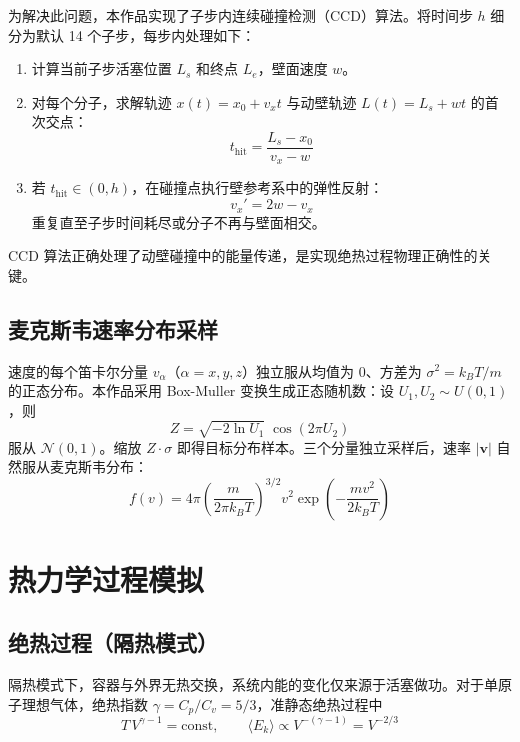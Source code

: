\documentclass[zihao=-4,a4paper,oneside]{ctexbook}
\newcommand{\avg}[1]{\langle #1 \rangle}
\newcommand{\kb}{k_{\!B}}
\newcommand{\abs}[1]{\lvert#1\rvert}
\begin{document}
为解决此问题，本作品实现了子步内连续碰撞检测（CCD）算法。将时间步 $h$ 细分为默认 14 个子步，每步内处理如下：

\begin{enumerate}
  \item 计算当前子步活塞位置 $L_s$ 和终点 $L_e$，壁面速度 $w$。
  \item 对每个分子，求解轨迹 $x(t)=x_0+v_x t$ 与动壁轨迹 $L(t)=L_s+wt$ 的首次交点：
  \begin{equation}
    t_{\text{hit}} = \frac{L_s-x_0}{v_x-w}
  \end{equation}
  \item 若 $t_{\text{hit}}\in(0,h)$，在碰撞点执行壁参考系中的弹性反射：
  \begin{equation}
    v_x' = 2w - v_x
  \end{equation}
  重复直至子步时间耗尽或分子不再与壁面相交。
\end{enumerate}
CCD 算法正确处理了动壁碰撞中的能量传递，是实现绝热过程物理正确性的关键。

\subsection{麦克斯韦速率分布采样}

速度的每个笛卡尔分量 $v_\alpha$（$\alpha=x,y,z$）独立服从均值为 $0$、方差为 $\sigma^2=\kb T/m$ 的正态分布。本作品采用 Box-Muller 变换生成正态随机数：设 $U_1,U_2\sim U(0,1)$，则
\begin{equation}
  Z = \sqrt{-2\ln U_1}\;\cos(2\pi U_2)
\end{equation}
服从 $\mathcal{N}(0,1)$。缩放 $Z\cdot \sigma$ 即得目标分布样本。三个分量独立采样后，速率 $\abs{\bm{v}}$ 自然服从麦克斯韦分布：
\begin{equation}
  f(v)=4\pi\left(\frac{m}{2\pi\kb T}\right)^{\!3/2} v^2 \exp\!\left(-\frac{m v^2}{2\kb T}\right)
\end{equation}

\section{热力学过程模拟}

\subsection{绝热过程（隔热模式）}

隔热模式下，容器与外界无热交换，系统内能的变化仅来源于活塞做功。对于单原子理想气体，绝热指数 $\gamma=C_p/C_v=5/3$，准静态绝热过程中
\begin{equation}\label{eq:adiabat}
  T\,V^{\gamma-1}=\text{const},\qquad
  \avg{E_k}\propto V^{-(\gamma-1)}=V^{-2/3}
\end{equation}
\end{document}
